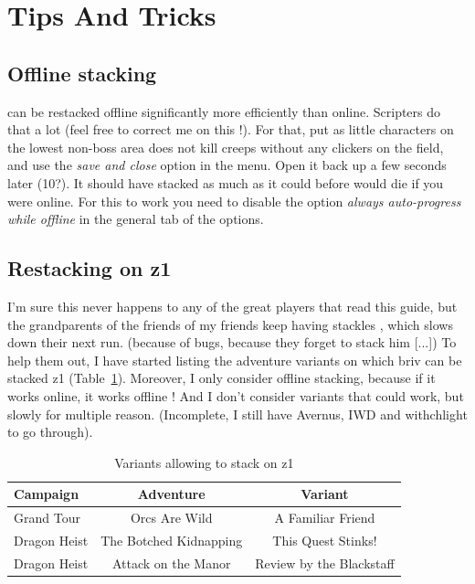 \documentclass{article}
\begin{document}
\section{Tips And Tricks}


\subsection{Offline \briv stacking}

\briv can be restacked offline significantly more efficiently than online.
Scripters do that a lot (feel free to correct me on this !).
For that, put as little characters on the lowest non-boss area \briv does not kill creeps without any clickers on the field, and use the \textit{save and close} option in the menu.
Open it back up a few seconds later (10?).
It should have stacked as much as it could before \briv would die if you were online.
For this to work you need to disable the option \textit{always auto-progress while offline} in the general tab of the options.


\subsection{Restacking \briv on z1}

I'm sure this never happens to any of the great players that read this guide, but the grandparents of the friends of my friends keep having stackles \briv, which slows down their next run.
(because of bugs, because they forget to stack him [...])
To help them out, I have started listing the adventure variants on which briv can be stacked z1 (Table~\ref{tbl:stackingBriv}).
Moreover, I only consider offline stacking, because if it works online, it works offline !
And I don't consider variants that could work, but slowly for multiple reason.
(Incomplete, I still have Avernus, IWD and withchlight to go through).

\begin{table}[ht!]
\centering
\caption{Variants allowing to stack \briv on z1
}
\label{tbl:stackingBriv}
\begin{small}
\begin{tabular}{ l | c c }
\toprule
Campaign & Adventure & Variant \\
\midrule
Grand Tour & Orcs Are Wild & A Familiar Friend \\
Dragon Heist & The Botched Kidnapping & This Quest Stinks! \\
Dragon Heist & Attack on the Manor & Review by the Blackstaff \\
\bottomrule
\end{tabular}
\end{small}
\end{table}
\end{document}
